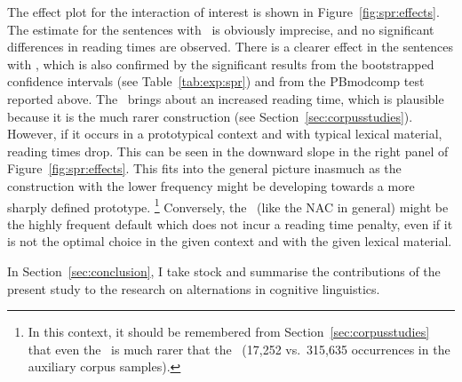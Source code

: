 The effect plot for the interaction of interest is shown in Figure~\ref{fig:spr:effects}.
The estimate for the sentences with \NACa\ is obviously imprecise, and no significant differences in reading times are observed.
There is a clearer effect in the sentences with \PGCa, which is also confirmed by the significant results from the bootstrapped confidence intervals (see Table~\ref{tab:exp:spr}) and from the PBmodcomp test reported above.
The \PGCa\ brings about an increased reading time, which is plausible because it is the much rarer construction (see Section~\ref{sec:corpusstudies}).
However, if it occurs in a prototypical context and with typical lexical material, reading times drop.
This can be seen in the downward slope in the right panel of Figure~\ref{fig:spr:effects}.
This fits into the general picture inasmuch as the construction with the lower frequency might be developing towards a more sharply defined prototype.%
\footnote{In this context, it should be remembered from Section~\ref{sec:corpusstudies} that even the \PGCd\ is much rarer that the \NACb\ (17,252 vs.\ 315,635 occurrences in the auxiliary corpus samples).}
Conversely, the \NACa\ (like the NAC in general) might be the highly frequent default which does not incur a reading time penalty, even if it is not the optimal choice in the given context and with the given lexical material.

In Section~\ref{sec:conclusion}, I take stock and summarise the contributions of the present study to the research on alternations in cognitive linguistics.
